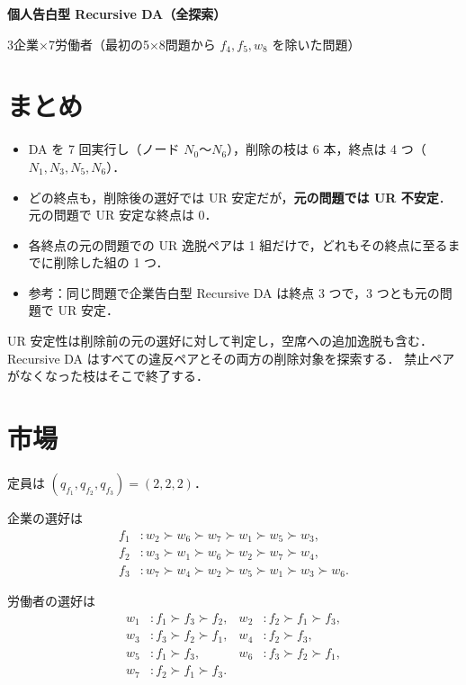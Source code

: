 \documentclass[a4paper,10pt]{ltjsarticle}
\begin{document}
{\Large\bfseries 個人告白型 Recursive DA（全探索）}\par
{\small 3企業×7労働者（最初の5×8問題から $f_4, f_5, w_8$ を除いた問題）}

\section*{まとめ}

\begin{itemize}
  \setlength{\itemsep}{1pt}
  \item DA を 7 回実行し（ノード $N_0$〜$N_6$），削除の枝は 6 本，終点は 4 つ（$N_1, N_3, N_5, N_6$）．
  \item どの終点も，削除後の選好では UR 安定だが，\textbf{元の問題では UR 不安定}．元の問題で UR 安定な終点は 0．
  \item 各終点の元の問題での UR 逸脱ペアは 1 組だけで，どれもその終点に至るまでに削除した組の 1 つ．
  \item 参考：同じ問題で企業告白型 Recursive DA は終点 3 つで，3 つとも元の問題で UR 安定．
\end{itemize}

UR 安定性は削除前の元の選好に対して判定し，空席への追加逸脱も含む．
Recursive DA はすべての違反ペアとその両方の削除対象を探索する．
禁止ペアがなくなった枝はそこで終了する．

\section*{市場}

定員は $(q_{f_1}, q_{f_2}, q_{f_3}) = (2, 2, 2)$．

\begin{minipage}[t]{0.55\linewidth}
企業の選好は
\begin{align*}
  f_1 &: w_2 \succ w_6 \succ w_7 \succ w_1 \succ w_5 \succ w_3, \\
  f_2 &: w_3 \succ w_1 \succ w_6 \succ w_2 \succ w_7 \succ w_4, \\
  f_3 &: w_7 \succ w_4 \succ w_2 \succ w_5 \succ w_1 \succ w_3 \succ w_6.
\end{align*}
\end{minipage}\hfill
\begin{minipage}[t]{0.4\linewidth}
労働者の選好は
\begin{align*}
  w_1 &: f_1 \succ f_3 \succ f_2, &
  w_2 &: f_2 \succ f_1 \succ f_3, \\
  w_3 &: f_3 \succ f_2 \succ f_1, &
  w_4 &: f_2 \succ f_3, \\
  w_5 &: f_1 \succ f_3, &
  w_6 &: f_3 \succ f_2 \succ f_1, \\
  w_7 &: f_2 \succ f_1 \succ f_3.
\end{align*}
\end{minipage}
\end{document}
